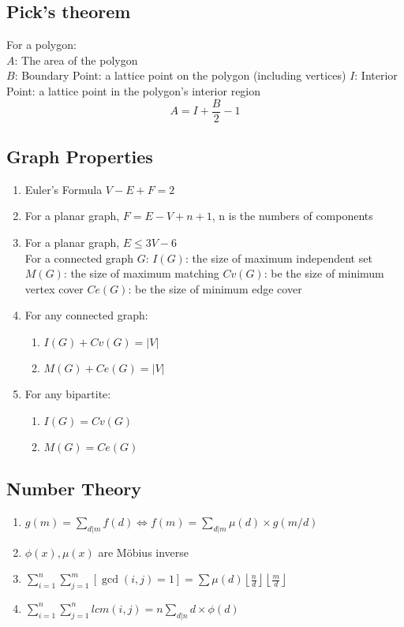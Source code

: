 %

\subsection{Pick's theorem}
For a polygon: \\
$A$: The area of the polygon \\
$B$: Boundary Point: a lattice point on the polygon (including vertices)
$I$: Interior Point: a lattice point in the polygon’s interior region
$$A= I + \frac{B}{2} - 1$$

\subsection{Graph Properties}
\begin{enumerate}\itemsep = -5pt
\item Euler's Formula $V-E+F=2$
\item For a planar graph, $F=E-V+n+1$, n is the numbers of components
\item For a planar graph, $E\leq 3V-6$ \\

For a connected graph $G$:
$I(G)$: the size of maximum independent set
$M(G)$: the size of maximum matching
$Cv(G)$: be the size of minimum vertex cover
$Ce(G)$: be the size of minimum edge cover
\item For any connected graph:
  \begin{enumerate}\itemsep = -3pt
  \item $I(G)+Cv(G)=|V|$
  \item $M(G)+Ce(G)=|V|$
  \end{enumerate}
\item For any bipartite:
  \begin{enumerate}\itemsep = -3pt
  \item $I(G)=Cv(G)$
  \item $M(G)=Ce(G)$
   \end{enumerate}
\end{enumerate}



\subsection{Number Theory}
\begin{enumerate}\itemsep = -3pt
  \item $g(m)=\sum_{d|m}f(d)\Leftrightarrow f(m)=\sum_{d|m}\mu (d) \times g(m/d)$
  \item $\phi(x), \mu(x)$ are Möbius inverse
  \item $\sum_{i=1}^n\sum_{j=1}^m [\gcd(i, j) = 1]=\sum \mu(d)\left \lfloor \frac{n}{d} \right \rfloor \left \lfloor \frac{m}{d} \right \rfloor$
  \item $\sum_{i=1}^n\sum_{j=1}^nlcm(i,j)=n\sum_{d|n} d \times \phi (d)$
\end{enumerate}

